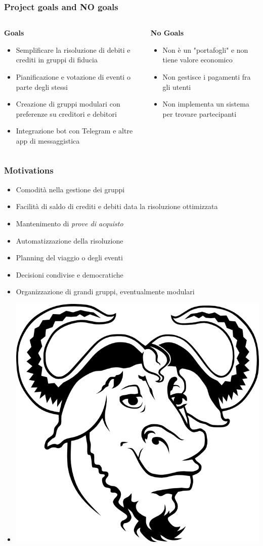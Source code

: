 \documentclass[11pt]{beamer}
\begin{document}
	\begin{frame}
		\frametitle{Project goals and NO goals}
		
		\begin{columns}
			\begin{column}{.45\linewidth}
				\begin{center}
					\textbf{Goals}
				\end{center}
				\begin{itemize}
					\item Semplificare la risoluzione di debiti e crediti in gruppi di fiducia
					\item Pianificazione e votazione di eventi o parte degli stessi
					\item Creazione di gruppi modulari con preferenze su creditori e debitori
					\item Integrazione bot con Telegram e altre app di messaggistica
				\end{itemize}
			\end{column}
			\begin{column}{.45\linewidth}
				\begin{center}
					\textbf{No Goals}
				\end{center}
				\begin{itemize}
					\item Non è un "portafogli" e non tiene valore economico
					\item Non gestisce i pagamenti fra gli utenti%
					\item Non implementa un sistema per trovare partecipanti
				\end{itemize}
			\end{column}
		\end{columns}
	\end{frame}

	\begin{frame}
		\frametitle{Motivations}
		
		\begin{itemize}
			\item Comodità nella gestione dei gruppi
			\item Facilità di saldo di crediti e debiti data la risoluzione ottimizzata
			\item Mantenimento di \textit{prove di acquisto}
			\item Automatizzazione della risoluzione
			\item Planning del viaggio o degli eventi
			\item Decisioni condivise e democratiche
			\item Organizzazione di grandi gruppi, eventualmente modulari
			\item[] \includegraphics[width=.1\linewidth]{gnu.png}
		\end{itemize}
	\end{frame}
\end{document}
